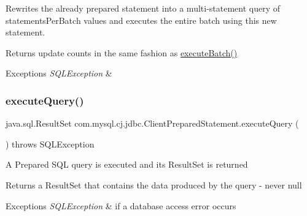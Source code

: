 Rewrites the already prepared statement into a multi-\/statement query of \textquotesingle{}statements\+Per\+Batch\textquotesingle{} values and executes the entire batch using this new statement.

\begin{DoxyReturn}{Returns}
update counts in the same fashion as \mbox{\hyperlink{classcom_1_1mysql_1_1cj_1_1jdbc_1_1_statement_impl_a812ff94727864cc68fe96aaa38dbce6a}{execute\+Batch()}}
\end{DoxyReturn}

\begin{DoxyExceptions}{Exceptions}
{\em S\+Q\+L\+Exception} & \\
\hline
\end{DoxyExceptions}
\mbox{\label{classcom_1_1mysql_1_1cj_1_1jdbc_1_1_client_prepared_statement_a3c87e86e004b4f406cef86e3738546b8}} 
\subsubsection{\texorpdfstring{execute\+Query()}{executeQuery()}}
{\footnotesize\ttfamily java.\+sql.\+Result\+Set com.\+mysql.\+cj.\+jdbc.\+Client\+Prepared\+Statement.\+execute\+Query (\begin{DoxyParamCaption}{ }\end{DoxyParamCaption}) throws S\+Q\+L\+Exception}

A Prepared S\+QL query is executed and its Result\+Set is returned

\begin{DoxyReturn}{Returns}
a Result\+Set that contains the data produced by the query -\/ never null
\end{DoxyReturn}

\begin{DoxyExceptions}{Exceptions}
{\em S\+Q\+L\+Exception} & if a database access error occurs \\
\hline
\end{DoxyExceptions}
\mbox{\label{classcom_1_1mysql_1_1cj_1_1jdbc_1_1_client_prepared_statement_a71cd036bccd4ec78a85b861e4a548e1f}} 
